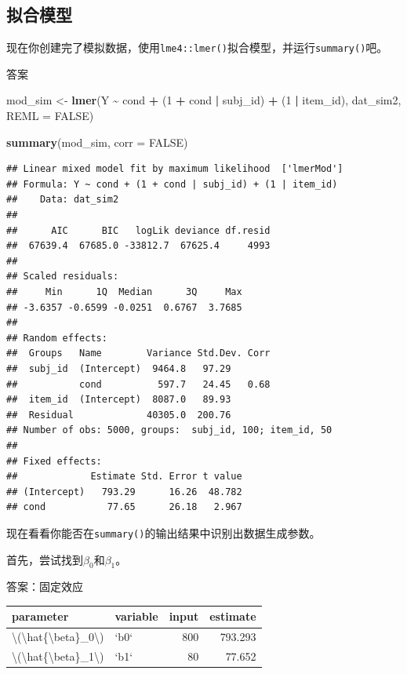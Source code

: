 \documentclass[
]{book}
\newenvironment{Shaded}{\begin{snugshade}}{\end{snugshade}}
\newcommand{\AttributeTok}[1]{\textcolor[rgb]{0.13,0.29,0.53}{#1}}
\newcommand{\ConstantTok}[1]{\textcolor[rgb]{0.56,0.35,0.01}{#1}}
\newcommand{\DecValTok}[1]{\textcolor[rgb]{0.00,0.00,0.81}{#1}}
\newcommand{\FunctionTok}[1]{\textcolor[rgb]{0.13,0.29,0.53}{\textbf{#1}}}
\newcommand{\NormalTok}[1]{#1}
\newcommand{\OtherTok}[1]{\textcolor[rgb]{0.56,0.35,0.01}{#1}}
\newcommand{\SpecialCharTok}[1]{\textcolor[rgb]{0.81,0.36,0.00}{\textbf{#1}}}
\begin{document}
\hypertarget{ux62dfux5408ux6a21ux578b}{%
\subsection{拟合模型}\label{ux62dfux5408ux6a21ux578b}}

现在你创建完了模拟数据，使用\texttt{lme4::lmer()}拟合模型，并运行\texttt{summary()}吧。

答案

\begin{Shaded}
\begin{Highlighting}[]
\NormalTok{mod\_sim }\OtherTok{\textless{}{-}} \FunctionTok{lmer}\NormalTok{(Y }\SpecialCharTok{\textasciitilde{}}\NormalTok{ cond }\SpecialCharTok{+}\NormalTok{ (}\DecValTok{1} \SpecialCharTok{+}\NormalTok{ cond }\SpecialCharTok{|}\NormalTok{ subj\_id) }\SpecialCharTok{+}\NormalTok{ (}\DecValTok{1} \SpecialCharTok{|}\NormalTok{ item\_id),}
\NormalTok{                dat\_sim2, }\AttributeTok{REML =} \ConstantTok{FALSE}\NormalTok{)}

\FunctionTok{summary}\NormalTok{(mod\_sim, }\AttributeTok{corr =} \ConstantTok{FALSE}\NormalTok{)}
\end{Highlighting}
\end{Shaded}

\begin{verbatim}
## Linear mixed model fit by maximum likelihood  ['lmerMod']
## Formula: Y ~ cond + (1 + cond | subj_id) + (1 | item_id)
##    Data: dat_sim2
## 
##      AIC      BIC   logLik deviance df.resid 
##  67639.4  67685.0 -33812.7  67625.4     4993 
## 
## Scaled residuals: 
##     Min      1Q  Median      3Q     Max 
## -3.6357 -0.6599 -0.0251  0.6767  3.7685 
## 
## Random effects:
##  Groups   Name        Variance Std.Dev. Corr
##  subj_id  (Intercept)  9464.8   97.29       
##           cond          597.7   24.45   0.68
##  item_id  (Intercept)  8087.0   89.93       
##  Residual             40305.0  200.76       
## Number of obs: 5000, groups:  subj_id, 100; item_id, 50
## 
## Fixed effects:
##             Estimate Std. Error t value
## (Intercept)   793.29      16.26  48.782
## cond           77.65      26.18   2.967
\end{verbatim}

现在看看你能否在\texttt{summary()}的输出结果中识别出数据生成参数。

首先，尝试找到\(\beta_0\)和\(\beta_1\)。

答案：固定效应

\begin{tabular}{l|l|r|r}
\hline
parameter & variable & input & estimate\\
\hline
\textbackslash{}(\textbackslash{}hat\{\textbackslash{}beta\}\_0\textbackslash{}) & `b0` & 800 & 793.293\\
\hline
\textbackslash{}(\textbackslash{}hat\{\textbackslash{}beta\}\_1\textbackslash{}) & `b1` & 80 & 77.652\\
\hline
\end{tabular}
\end{document}
